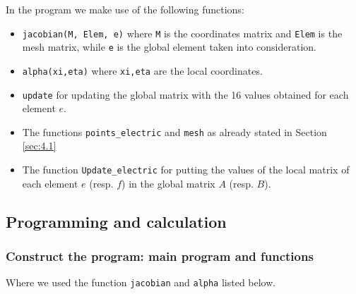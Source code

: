 In the program we make use of the following functions:
\begin{itemize}
	\item \texttt{jacobian(M, Elem, e)} where \texttt{M} is the coordinates matrix and \texttt{Elem} is the mesh matrix, while \texttt{e} is the global element taken into consideration.
	\item \texttt{alpha(xi,eta)} where \texttt{xi,eta} are the local coordinates.
	\item \texttt{update} for updating the global matrix with the 16 values obtained for each element $ e $. 
	\item The functions \texttt{points\_electric} and \texttt{mesh} as already stated in Section \ref{sec:4.1} 
	\item The function \texttt{Update\_electric} for putting the values of the local matrix of each element $ e $ (resp. $ f $) in the global matrix $ A $ (resp. $ B $).
\end{itemize}



\subsection{Programming and calculation}
\subsubsection{Construct the program: main program and functions}


Where we used the function \texttt{jacobian} and \texttt{alpha} listed below.










